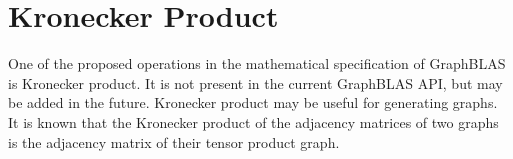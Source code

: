  \section{Kronecker Product}
\label{Chp:Extensions}
One of the proposed operations in the mathematical specification of GraphBLAS is Kronecker product. It is not present in the current GraphBLAS API, but may be added in the future. Kronecker product may be useful for generating graphs. It is known that the Kronecker product of the adjacency matrices of two graphs is the adjacency matrix of their tensor product graph.

